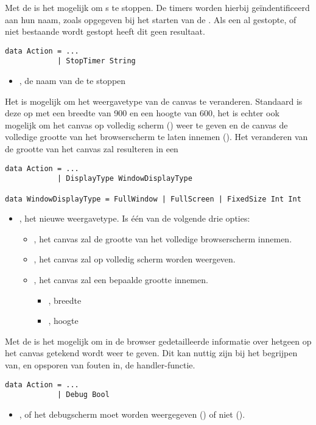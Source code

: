 Met de  is het mogelijk om s te stoppen. De timers worden hierbij geïndentificeerd aan hun naam, zoals opgegeven bij het starten van de . Als een al gestopte, of niet bestaande  wordt gestopt heeft dit geen resultaat.
\begin{lstlisting}
data Action = ...
			| StopTimer String
\end{lstlisting}
\begin{itemize}
	\item {}, de naam van de te stoppen 
\end{itemize} 

Het is mogelijk om het weergavetype van de canvas te veranderen. Standaard is deze op  met een breedte van 900 en een hoogte van 600, het is echter ook mogelijk om het canvas op volledig scherm () weer te geven en de canvas de volledige grootte van het browserscherm te laten innemen (). Het veranderen van de grootte van het canvas zal resulteren in een 
\begin{lstlisting}
data Action = ...
			| DisplayType WindowDisplayType
			
data WindowDisplayType = FullWindow | FullScreen | FixedSize Int Int
\end{lstlisting}
\begin{itemize}
	\item {}, het nieuwe weergavetype. Is één van de volgende drie opties:
		\begin{itemize}
			\item {}, het canvas zal de grootte van het volledige browserscherm innemen.
			\item {}, het canvas zal op volledig scherm worden weergeven.
			\item {}, het canvas zal een bepaalde grootte innemen. 
				\begin{itemize}
					\item {}, breedte
					\item {}, hoogte
				\end{itemize}
		\end{itemize}
\end{itemize}

Met de  is het mogelijk om in de browser gedetailleerde informatie over hetgeen op het canvas getekend wordt weer te geven. Dit kan nuttig zijn bij het begrijpen van, en opsporen van fouten in, de handler-functie.
\begin{lstlisting}
data Action = ...
			| Debug Bool
\end{lstlisting}
\begin{itemize}
	\item {}, of het debugscherm moet worden weergegeven () of niet ().
\end{itemize}

